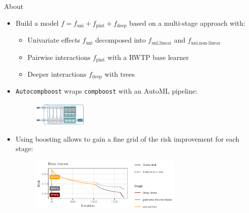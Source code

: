 \documentclass[t,10pt]{beamer}
\begin{document}
\begin{frame}{About}
  \begin{itemize}
    \item Build a model $f = f_{\text{uni}} + f_{\text{pint}} + f_{\text{deep}}$ based on a multi-stage approach with:
      \begin{itemize}
        \item Univariate effects $f_{\text{uni}}$ decomposed into $f_{\text{uni,linear}}$ and $f_{\text{uni,non-linear}}$
        \item Pairwise interactions $f_{\text{pint}}$ with a RWTP base learner
        \item Deeper interactions $f_{\text{deep}}$ with trees
      \end{itemize}
    \item \texttt{Autocompboost} wraps \texttt{compboost} with an AutoML pipeline:
      \begin{figure}
        \centering
        \includegraphics[width=0.25\textwidth]{figures/fig-acwb-ml-pipeline.png}
      \end{figure}
    \item Using boosting allows to gain a fine grid of the risk improvement for each stage:
      \begin{figure}
        \centering
        \includegraphics[width=0.7\textwidth]{figures/fig-acwb-risk.png}
      \end{figure}
  \end{itemize}
	\addtocounter{framenumber}{-1}
\end{frame}
\end{document}
